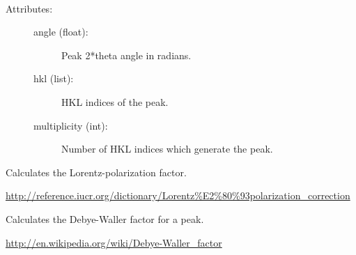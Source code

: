 \documentclass[letterpaper,10pt,english]{sphinxmanual}
\begin{document}
\begin{fulllineitems}
\begin{fulllineitems}
\begin{description}
\begin{description}
\end{description}

\end{description}

\end{fulllineitems}


\begin{fulllineitems}
\label{models:qmpy.XRD.get_peaks}
\end{fulllineitems}


\end{fulllineitems}


\begin{fulllineitems}
\label{models:qmpy.Peak}~\begin{description}
\item[{Attributes:}] \leavevmode\begin{description}
\item[{angle (float): }] \leavevmode
Peak 2*theta angle in radians.

\item[{hkl (list): }] \leavevmode
HKL indices of the peak.

\item[{multiplicity (int): }] \leavevmode
Number of HKL indices which generate the peak.

\end{description}

\end{description}

\begin{fulllineitems}
\label{models:qmpy.Peak.lp_factor}
Calculates the Lorentz-polarization factor.

\href{http://reference.iucr.org/dictionary/Lorentz\%E2\%80\%93polarization\_correction}{http://reference.iucr.org/dictionary/Lorentz\%E2\%80\%93polarization\_correction}

\end{fulllineitems}


\begin{fulllineitems}
\label{models:qmpy.Peak.thermal_factor}
Calculates the Debye-Waller factor for a peak.

\href{http://en.wikipedia.org/wiki/Debye-Waller\_factor}{http://en.wikipedia.org/wiki/Debye-Waller\_factor}

\end{fulllineitems}


\end{fulllineitems}
\end{document}
